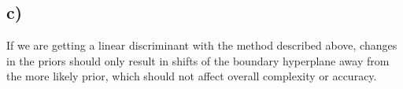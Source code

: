 \documentclass[paper=a4,fontsize=10pt,DIV11,BCOR10mm]{scrartcl}
\begin{document}
	\subsection*{c)} If we are getting a linear discriminant with the method described above, changes in the priors should only result in shifts of the boundary hyperplane away from the more likely prior, which should not affect overall complexity or accuracy.
	






\end{document}
